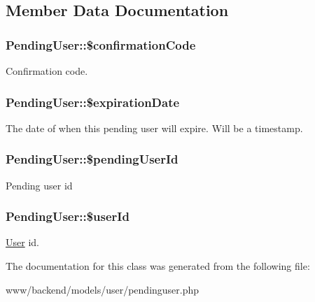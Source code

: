 \subsection{Member Data Documentation}
\hypertarget{classPendingUser_af0819189ce856cdde304084503839520}{
\subsubsection[{\$confirmationCode}]{\setlength{\rightskip}{0pt plus 5cm}PendingUser::\$confirmationCode}}
\label{classPendingUser_af0819189ce856cdde304084503839520}
Confirmation code. \hypertarget{classPendingUser_a0319c006a79b51b47ef224fba80bf7c7}{
\subsubsection[{\$expirationDate}]{\setlength{\rightskip}{0pt plus 5cm}PendingUser::\$expirationDate}}
\label{classPendingUser_a0319c006a79b51b47ef224fba80bf7c7}
The date of when this pending user will expire. Will be a timestamp. \hypertarget{classPendingUser_a3555aa718d233a642bf6d72cf4f2b3b6}{
\subsubsection[{\$pendingUserId}]{\setlength{\rightskip}{0pt plus 5cm}PendingUser::\$pendingUserId}}
\label{classPendingUser_a3555aa718d233a642bf6d72cf4f2b3b6}
Pending user id \hypertarget{classPendingUser_a059b78d9120ca9e3c497bc6860f39b03}{
\subsubsection[{\$userId}]{\setlength{\rightskip}{0pt plus 5cm}PendingUser::\$userId}}
\label{classPendingUser_a059b78d9120ca9e3c497bc6860f39b03}
\hyperlink{classUser}{User} id. 

The documentation for this class was generated from the following file:\begin{DoxyCompactItemize}
\item 
www/backend/models/user/pendinguser.php\end{DoxyCompactItemize}
